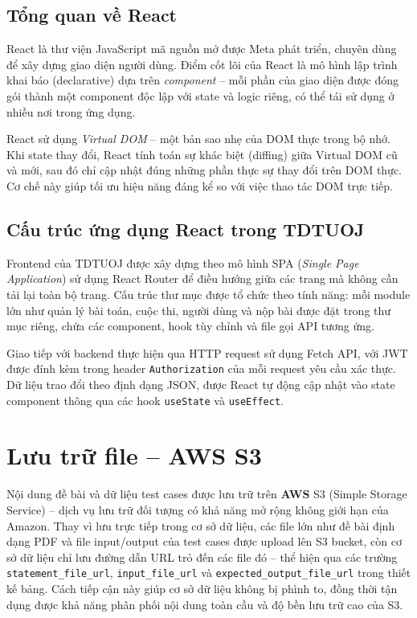 \documentclass[12pt, a4paper]{report}
\begin{document}
\subsection{Tổng quan về React}

React là thư viện JavaScript mã nguồn mở được Meta phát triển, chuyên dùng để xây dựng giao diện người dùng. Điểm cốt lõi của React là mô hình lập trình khai báo (declarative) dựa trên \textit{component} -- mỗi phần của giao diện được đóng gói thành một component độc lập với state và logic riêng, có thể tái sử dụng ở nhiều nơi trong ứng dụng.

React sử dụng \textit{Virtual DOM} -- một bản sao nhẹ của DOM thực trong bộ nhớ. Khi state thay đổi, React tính toán sự khác biệt (diffing) giữa Virtual DOM cũ và mới, sau đó chỉ cập nhật đúng những phần thực sự thay đổi trên DOM thực. Cơ chế này giúp tối ưu hiệu năng đáng kể so với việc thao tác DOM trực tiếp.

\subsection{Cấu trúc ứng dụng React trong TDTUOJ}

Frontend của TDTUOJ được xây dựng theo mô hình SPA (\textit{Single Page Application}) sử dụng React Router để điều hướng giữa các trang mà không cần tải lại toàn bộ trang. Cấu trúc thư mục được tổ chức theo tính năng: mỗi module lớn như quản lý bài toán, cuộc thi, người dùng và nộp bài được đặt trong thư mục riêng, chứa các component, hook tùy chỉnh và file gọi \ac{API} tương ứng.

Giao tiếp với backend thực hiện qua \ac{HTTP} request sử dụng Fetch API, với \ac{JWT} được đính kèm trong header \texttt{Authorization} của mỗi request yêu cầu xác thực. Dữ liệu trao đổi theo định dạng \ac{JSON}, được React tự động cập nhật vào state component thông qua các hook \texttt{useState} và \texttt{useEffect}.

\section{Lưu trữ file -- AWS S3}

Nội dung đề bài và dữ liệu test cases được lưu trữ trên \textbf{AWS} S3 (Simple Storage Service) -- dịch vụ lưu trữ đối tượng có khả năng mở rộng không giới hạn của Amazon. Thay vì lưu trực tiếp trong cơ sở dữ liệu, các file lớn như đề bài định dạng \ac{PDF} và file input/output của test cases được upload lên S3 bucket, còn cơ sở dữ liệu chỉ lưu đường dẫn URL trỏ đến các file đó -- thể hiện qua các trường \texttt{statement\_file\_url}, \texttt{input\_file\_url} và \texttt{expected\_output\_file\_url} trong thiết kế bảng. Cách tiếp cận này giúp cơ sở dữ liệu không bị phình to, đồng thời tận dụng được khả năng phân phối nội dung toàn cầu và độ bền lưu trữ cao của S3.
\end{document}
